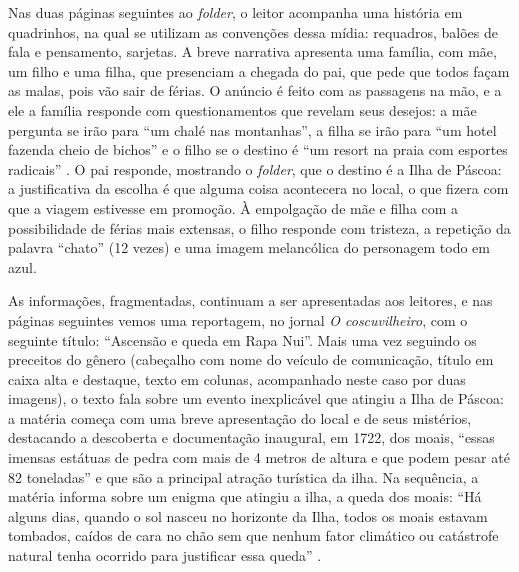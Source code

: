 \documentclass[portuguese]{textolivre}
\begin{document}
Nas duas páginas seguintes ao \textit{folder}, o leitor acompanha uma história
em quadrinhos, na qual se utilizam as convenções dessa mídia: requadros, balões
de fala e pensamento, sarjetas. A breve narrativa apresenta uma família, com
mãe, um filho e uma filha, que presenciam a chegada do pai, que pede que todos
façam as malas, pois vão sair de férias. O anúncio é feito com as passagens na
mão, e a ele a família responde com questionamentos que revelam seus desejos: a
mãe pergunta se irão para “um chalé nas montanhas”, a filha se irão para “um
hotel fazenda cheio de bichos” e o filho se o destino é “um resort na praia com
esportes radicais” \cite[p.~8]{franco_queda_2018}. O pai responde, mostrando o
\textit{folder}, que o destino é a Ilha de Páscoa: a justificativa da escolha é
que alguma coisa acontecera no local, o que fizera com que a viagem estivesse
em promoção. À empolgação de mãe e filha com a possibilidade de férias mais
extensas, o filho responde com tristeza, a repetição da palavra “chato” (12
vezes) e uma imagem melancólica do personagem todo em azul.

As informações, fragmentadas, continuam a ser apresentadas aos leitores, e nas
páginas seguintes vemos uma reportagem, no jornal \textit{O coscuvilheiro}, com
o seguinte título: “Ascensão e queda em Rapa Nui”. Mais uma vez seguindo os
preceitos do gênero (cabeçalho com nome do veículo de comunicação, título em
caixa alta e destaque, texto em colunas, acompanhado neste caso por duas
imagens), o texto fala sobre um evento inexplicável que atingiu a Ilha de
Páscoa: a matéria começa com uma breve apresentação do local e de seus
mistérios, destacando a descoberta e documentação inaugural, em 1722, dos
moais, “essas imensas estátuas de pedra com mais de 4 metros de altura e que
podem pesar até 82 toneladas” e que são a principal atração turística da ilha.
Na sequência, a matéria informa sobre um enigma que atingiu a ilha, a queda dos
moais: “Há alguns dias, quando o sol nasceu no horizonte da Ilha, todos os
moais estavam tombados, caídos de cara no chão sem que nenhum fator climático
ou catástrofe natural tenha ocorrido para justificar essa queda”
\cite[p.~10-11]{franco_queda_2018}.
\end{document}
